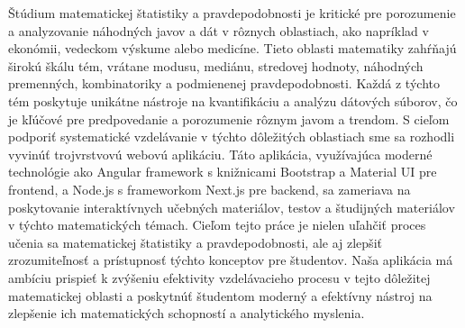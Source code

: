 Štúdium matematickej štatistiky a pravdepodobnosti je kritické pre porozumenie a
analyzovanie náhodných javov a dát v rôznych oblastiach, ako napríklad v ekonómii,
vedeckom výskume alebo medicíne. Tieto oblasti matematiky zahŕňajú širokú škálu
tém, vrátane modusu, mediánu, stredovej hodnoty, náhodných premenných,
kombinatoriky a podmienenej pravdepodobnosti. Každá z týchto tém poskytuje
unikátne nástroje na kvantifikáciu a analýzu dátových súborov, čo je kľúčové pre
predpovedanie a porozumenie rôznym javom a trendom.
S cieľom podporiť systematické vzdelávanie v týchto dôležitých oblastiach sme sa
rozhodli vyvinúť trojvrstvovú webovú aplikáciu. Táto aplikácia, využívajúca moderné
technológie ako Angular framework s knižnicami Bootstrap a Material UI pre frontend,
a Node.js s frameworkom Next.js pre backend, sa zameriava na poskytovanie
interaktívnych učebných materiálov, testov a študijných materiálov v týchto
matematických témach.
Cieľom tejto práce je nielen uľahčiť proces učenia sa matematickej štatistiky a
pravdepodobnosti, ale aj zlepšiť zrozumiteľnosť a prístupnosť týchto konceptov pre
študentov. Naša aplikácia má ambíciu prispieť k zvýšeniu efektivity vzdelávacieho
procesu v tejto dôležitej matematickej oblasti a poskytnúť študentom moderný a
efektívny nástroj na zlepšenie ich matematických schopností a analytického myslenia.
